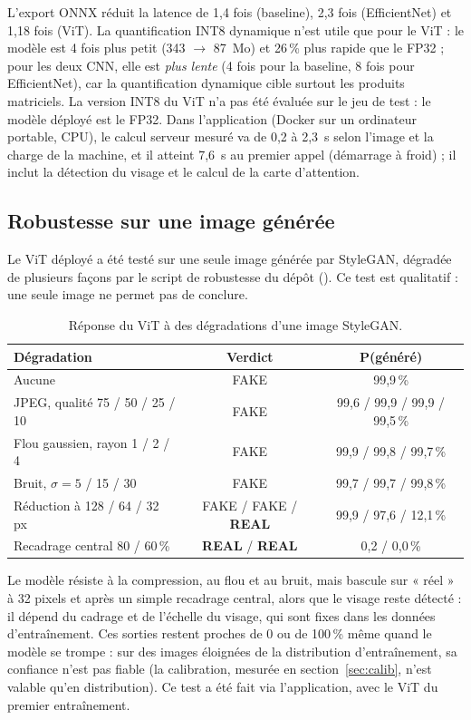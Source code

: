 \documentclass[11pt,a4paper]{article}
\DeclareRobustCommand{\fichier}[1]{\texttt{\StrSubstitute{\detokenize{#1}}{/}{/\allowbreak}}}
\begin{document}
L'export ONNX réduit la latence de 1,4 fois (baseline), 2,3 fois (EfficientNet) et 1,18 fois (ViT). La quantification INT8
dynamique n'est utile que pour le ViT : le modèle est 4 fois plus petit (343 $\to$ 87~Mo) et 26\,\% plus rapide que le
FP32 ; pour les deux CNN, elle est \emph{plus lente} (4 fois pour la baseline, 8 fois pour EfficientNet), car la
quantification dynamique cible surtout les produits matriciels. La version INT8 du ViT n'a pas été évaluée sur le jeu de
test : le modèle déployé est le FP32. Dans l'application (Docker sur un ordinateur portable, CPU), le calcul serveur
mesuré va de 0,2 à 2,3~s selon l'image et la charge de la machine, et il atteint 7,6~s au premier appel (démarrage à
froid) ; il inclut la détection du visage et le calcul de la carte d'attention.

\subsection{Robustesse sur une image générée}\label{sec:robustesse}

Le ViT déployé a été testé sur une seule image générée par StyleGAN, dégradée de plusieurs façons par le script de
robustesse du dépôt (\fichier{scripts/robustness_test.py}). Ce test est qualitatif : une seule image ne permet pas de
conclure.

\begin{table}[H]
\centering\small
\begin{tabular}{@{}lcc@{}}
\toprule
\textbf{Dégradation} & \textbf{Verdict} & \textbf{P(généré)} \\
\midrule
Aucune & FAKE & 99,9\,\% \\
JPEG, qualité 75 / 50 / 25 / 10 & FAKE & 99,6 / 99,9 / 99,9 / 99,5\,\% \\
Flou gaussien, rayon 1 / 2 / 4 & FAKE & 99,9 / 99,8 / 99,7\,\% \\
Bruit, $\sigma=5$ / 15 / 30 & FAKE & 99,7 / 99,7 / 99,8\,\% \\
Réduction à 128 / 64 / 32 px & FAKE / FAKE / \textbf{REAL} & 99,9 / 97,6 / 12,1\,\% \\
Recadrage central 80 / 60\,\% & \textbf{REAL} / \textbf{REAL} & 0,2 / 0,0\,\% \\
\bottomrule
\end{tabular}
\caption{Réponse du ViT à des dégradations d'une image StyleGAN.}
\end{table}

Le modèle résiste à la compression, au flou et au bruit, mais bascule sur « réel » à 32 pixels et après un simple
recadrage central, alors que le visage reste détecté : il dépend du cadrage et de l'échelle du visage, qui sont fixes
dans les données d'entraînement. Ces sorties restent proches de 0 ou de 100\,\% même quand le modèle se trompe : sur des
images éloignées de la distribution d'entraînement, sa confiance n'est pas fiable (la calibration, mesurée en
section~\ref{sec:calib}, n'est valable qu'en distribution). Ce test a été fait via l'application, avec le ViT du premier
entraînement.
\end{document}
